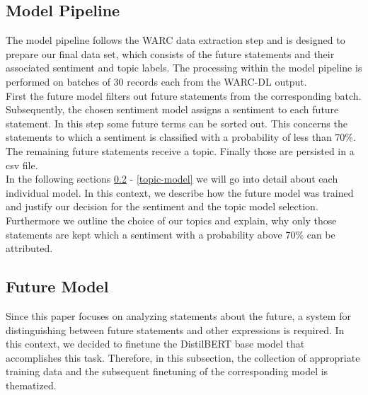 \subsection{Model Pipeline}
The model pipeline follows the WARC data extraction step and is designed to prepare our final data set, which consists of the future statements and their associated sentiment and topic labels.
The processing within the model pipeline is performed on batches of 30 records each from the WARC-DL output.
\\
First the future model filters out future statements from the corresponding batch.
Subsequently, the chosen sentiment model assigns a sentiment to each future statement.
In this step some future terms can be sorted out.
This concerns the statements to which a sentiment is classified with a probability of less than 70\%.
The remaining future statements receive a topic.
Finally those are persisted in a csv file.
\\
In the following sections \ref{future-model} - \ref{topic-model} we will go into detail about each individual model.
In this context, we describe how the future model was trained and justify our decision for the sentiment and the topic model selection.
Furthermore we outline the choice of our topics and explain, why only those statements are kept which a sentiment with a probability above 70\% can be attributed.

\subsection{Future Model}
\label{future-model}
Since this paper focuses on analyzing statements about the future, a system for distinguishing between future statements and other expressions is required.
In this context, we decided to finetune the DistilBERT \citep{Sanh2019DistilBERTAD} base model that accomplishes this task.
Therefore, in this subsection, the collection of appropriate training data and the subsequent finetuning of the corresponding model is thematized.

